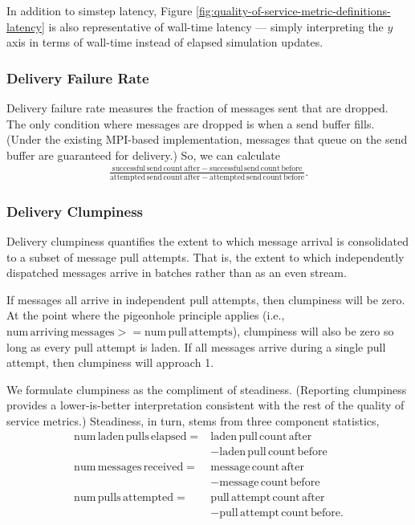 In addition to simstep latency, Figure \ref{fig:quality-of-service-metric-definitions-latency} is also representative of wall-time latency --- simply interpreting the $y$ axis in terms of wall-time instead of elapsed simulation updates.

\subsubsection{Delivery Failure Rate} \label{sec:delivery-failure-rate-metric}

Delivery failure rate measures the fraction of messages sent that are dropped.
The only condition where messages are dropped is when a send buffer fills.
(Under the existing MPI-based implementation, messages that queue on the send buffer are guaranteed for delivery.)
So, we can calculate
\begin{align*}
  \frac{
    \mathrm{successful\,send\,count\,after} - \mathrm{successful\,send\,count\,before}
  }{
    \mathrm{attempted\,send\,count\,after} - \mathrm{attempted\,send\,count\,before}
  }.
\end{align*}

\subsubsection{Delivery Clumpiness} \label{sec:delivery-clumpiness-metric}

Delivery clumpiness quantifies the extent to which message arrival is consolidated to a subset of message pull attempts.
That is, the extent to which independently dispatched messages arrive in batches rather than as an even stream.

If messages all arrive in independent pull attempts, then clumpiness will be zero.
At the point where the pigeonhole principle applies (i.e., $\mathrm{num\,arriving\,messages} >= \mathrm{num\,pull\,attempts}$), clumpiness will also be zero so long as every pull attempt is laden.
If all messages arrive during a single pull attempt, then clumpiness will approach 1.

We formulate clumpiness as the compliment of steadiness.
(Reporting clumpiness provides a lower-is-better interpretation consistent with the rest of the quality of service metrics.)
Steadiness, in turn, stems from three component statistics,
\begin{align*}
\mathrm{num\,laden\,pulls\,elapsed} =& \mathrm{laden\,pull\,count\,after} \\
  &- \mathrm{laden\,pull\,count\,before} \\
\mathrm{num\,messages\,received} =& \mathrm{message\,count\,after} \\
  &- \mathrm{message\,count\,before} \\
\mathrm{num\,pulls\,attempted} =& \mathrm{pull\,attempt\,count\,after} \\
  &- \mathrm{pull\,attempt\,count\,before}
.
\end{align*}

